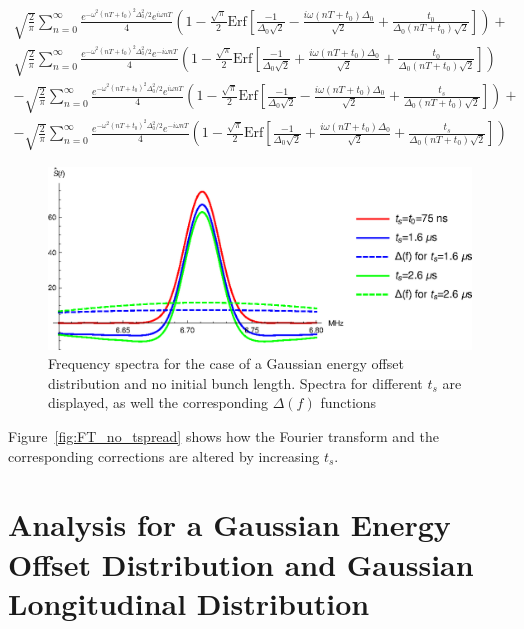 \begin{gather}
\sqrt{\frac{2}{\pi}}\sum^{\infty}_{n=0}\frac{e^{-\omega^2(nT+t_0)^2\Delta^2_0/2}e^{i\omega nT}}{4}\left(1-\frac{\sqrt{\pi}}{2}\text{Erf}\left[\frac{-1}{\Delta_0\sqrt{2}}-\frac{i\omega (nT+t_0)\Delta_0}{\sqrt{2}}+\frac{t_0}{\Delta_0(nT+t_0)\sqrt{2}}\right]\right)+ \nonumber \\
\sqrt{\frac{2}{\pi}}\sum^{\infty}_{n=0}\frac{e^{-\omega^2(nT+t_0)^2\Delta^2_0/2}e^{-i\omega nT}}{4}\left(1-\frac{\sqrt{\pi}}{2}\text{Erf}\left[\frac{-1}{\Delta_0\sqrt{2}}+\frac{i\omega (nT+t_0)\Delta_0}{\sqrt{2}}+\frac{t_0}{\Delta_0(nT+t_0)\sqrt{2}}\right]\right) \nonumber \\
-\sqrt{\frac{2}{\pi}}\sum^{\infty}_{n=0}\frac{e^{-\omega^2(nT+t_0)^2\Delta^2_0/2}e^{i\omega nT}}{4}\left(1-\frac{\sqrt{\pi}}{2}\text{Erf}\left[\frac{-1}{\Delta_0\sqrt{2}}-\frac{i\omega (nT+t_0)\Delta_0}{\sqrt{2}}+\frac{t_s}{\Delta_0(nT+t_0)\sqrt{2}}\right]\right)+ \nonumber \\
-\sqrt{\frac{2}{\pi}}\sum^{\infty}_{n=0}\frac{e^{-\omega^2(nT+t_0)^2\Delta^2_0/2}e^{-i\omega nT}}{4}\left(1-\frac{\sqrt{\pi}}{2}\text{Erf}\left[\frac{-1}{\Delta_0\sqrt{2}}+\frac{i\omega (nT+t_0)\Delta_0}{\sqrt{2}}+\frac{t_s}{\Delta_0(nT+t_0)\sqrt{2}}\right]\right)
\end{gather}

\begin{figure}[ht]
\centering
\includegraphics[scale=1.0]{fig/FT_no_tspread.eps}
\caption{Frequency spectra for the case of a Gaussian energy offset distribution and no initial bunch length. Spectra for different $t_s$ are displayed, as well the corresponding $\Delta(f)$ functions}
\end{figure}

Figure~\ref{fig:FT_no_tspread} shows how the Fourier transform and the corresponding corrections are altered by increasing $t_s$.

\section{Analysis for a Gaussian Energy Offset Distribution and Gaussian Longitudinal Distribution}

